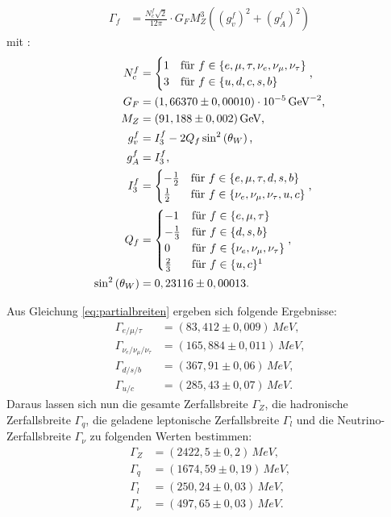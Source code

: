 \begin{align}
	\Gamma_f&=\frac{N_c^f\sqrt2}{12\pi}\cdot G_FM_Z^3\left(\left(g_v^f\right)^2+\left(g_A^f\right)^2\right)\label{eq:partialbreiten}
\end{align}
mit \cite{anleitungalt,nakamura}:
\begin{align}
	N_c^f&=
	\begin{cases}
		1&\text{für } f\in\{e, \mu, \tau, \nu_e, \nu_\mu, \nu_\tau\}\\
		3&\text{für } f\in\{u, d, c, s, b\}
	\end{cases}\text{,}\\
	G_F&=(1,66370\pm0,00010)\cdot10^{-5}\,\si{GeV^{-2}}\text{,}\\
	M_Z&=(91,188\pm0,002)\,\si{GeV}\text{,}\\
	g_v^f&=I_3^f-2Q_f\sin^2\left(\theta_W\right)\text{,}\\
	g_A^f&=I_3^f\text{,}\\
	I_3^f&=
	\begin{cases}
		-\frac12&\text{für } f\in\{e, \mu, \tau, d, s, b\}\\
		\frac12&\text{für } f\in\{\nu_e, \nu_\mu, \nu_\tau, u, c\}
	\end{cases}\text{,}\\
	Q_f&=
	\begin{cases}
		-1&\text{für } f\in\{e, \mu, \tau\}\\
		-\frac13&\text{für } f\in\{d, s, b\}\\
		0&\text{für } f\in\{\nu_e, \nu_\mu, \nu_\tau\}\\
		\frac23&\text{für } f\in\{u, c\}\footnotemark
	\end{cases}\text{,}\\
	\sin^2\left(\theta_W\right)&=0,23116\pm0,00013\text{.}
\end{align}

Aus Gleichung \ref{eq:partialbreiten} ergeben sich folgende Ergebnisse:
\begin{align}
	\Gamma_{e/\mu/\tau}&=(83,412\pm0,009)\,\si{MeV}\text{,}\\
	\Gamma_{\nu_e/\nu_\mu/\nu_\tau}&=(165,884\pm0,011)\,\si{MeV}\text{,}\\
	\Gamma_{d/s/b}&=(367,91\pm0,06)\,\si{MeV}\text{,}\\
	\Gamma_{u/c}&=(285,43\pm0,07)\,\si{MeV}\text{.}
\end{align}
Daraus lassen sich nun die gesamte Zerfallsbreite $\Gamma_Z$, die hadronische Zerfallsbreite $\Gamma_q$, die geladene leptonische Zerfallsbreite $\Gamma_l$ und die Neutrino-Zerfallsbreite $\Gamma_\nu$ zu folgenden Werten bestimmen:
\begin{align}
	\Gamma_Z&=(2422,5\pm0,2)\,\si{MeV}\text{,}\\
	\Gamma_q&=(1674,59\pm0,19)\,\si{MeV}\text{,}\\
	\Gamma_l&=(250,24\pm0,03)\,\si{MeV}\text{,}\\
	\Gamma_\nu&=(497,65\pm0,03)\,\si{MeV}\text{.}
\end{align}

